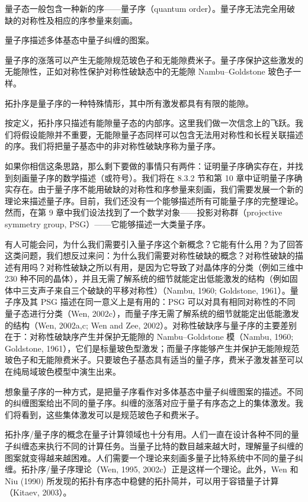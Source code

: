 \begin{keypoints}
\item 量子态一般包含一种新的序——量子序（quantum order）。量子序无法完全用破缺的对称性及相应的序参量来刻画。
\item 量子序描述多体基态中量子纠缠的图案。
\item 量子序的涨落可以产生无能隙规范玻色子和无能隙费米子。量子序保护这些激发的无能隙性，正如对称性保护对称性破缺态中的无能隙 Nambu--Goldstone 玻色子一样。
\item 拓扑序是量子序的一种特殊情形，其中所有激发都具有有限的能隙。
\end{keypoints}

按定义，拓扑序只描述有能隙量子态的内部序。这里我们做一次信念上的飞跃。我们将假设能隙并不重要，无能隙量子态同样可以包含无法用对称性和长程关联描述的序。我们将把量子基态中的非对称性破缺序称为量子序。

如果你相信这条思路，那么剩下要做的事情只有两件：证明量子序确实存在，并找到刻画量子序的数学描述（或符号）。我们将在 8.3.2 节和第 10 章中证明量子序确实存在。由于量子序不能用破缺的对称性和序参量来刻画，我们需要发展一个新的理论来描述量子序。目前，我们还没有一个能够描述所有可能量子序的完整理论。然而，在第 9 章中我们设法找到了一个数学对象——投影对称群（projective symmetry group, PSG）——它能够描述一大类量子序。

有人可能会问，为什么我们需要引入量子序这个新概念？它能有什么用？为了回答这类问题，我们想反过来问：为什么我们需要对称性破缺的概念？对称性破缺的描述有用吗？对称性破缺之所以有用，是因为它导致了对晶体序的分类（例如三维中 230 种不同的晶体），并且无需了解系统的细节就能定出低能激发的结构（例如固体中三支声子来自三个破缺的平移对称性）（Nambu, 1960; Goldstone, 1961）。量子序及其 PSG 描述在同一意义上是有用的：PSG 可以对具有相同对称性的不同量子态进行分类（Wen, 2002c），而量子序无需了解系统的细节就能定出低能激发的结构（Wen, 2002a,c; Wen and Zee, 2002）。对称性破缺序与量子序的主要差别在于：对称性破缺序产生并保护无能隙的 Nambu--Goldstone 模（Nambu, 1960; Goldstone, 1961），它们是标量玻色型激发；而量子序能够产生并保护无能隙规范玻色子和无能隙费米子。只要玻色子基态具有适当的量子序，费米子激发甚至可以在纯局域玻色模型中演生出来。

想象量子序的一种方式，是把量子序看作对多体基态中量子纠缠图案的描述。不同的纠缠图案给出不同的量子序。纠缠的涨落对应于量子有序态之上的集体激发。我们将看到，这些集体激发可以是规范玻色子和费米子。

拓扑序/量子序的概念在量子计算领域也十分有用。人们一直在设计各种不同的量子纠缠态来执行不同的计算任务。当量子比特的数目越来越大时，理解量子纠缠的图案就变得越来越困难。人们需要一个理论来刻画多量子比特系统中不同的量子纠缠。拓扑序/量子序理论（Wen, 1995, 2002c）正是这样一个理论。此外，Wen 和 Niu (1990) 所发现的拓扑有序态中稳健的拓扑简并，可以用于容错量子计算（Kitaev, 2003）。

